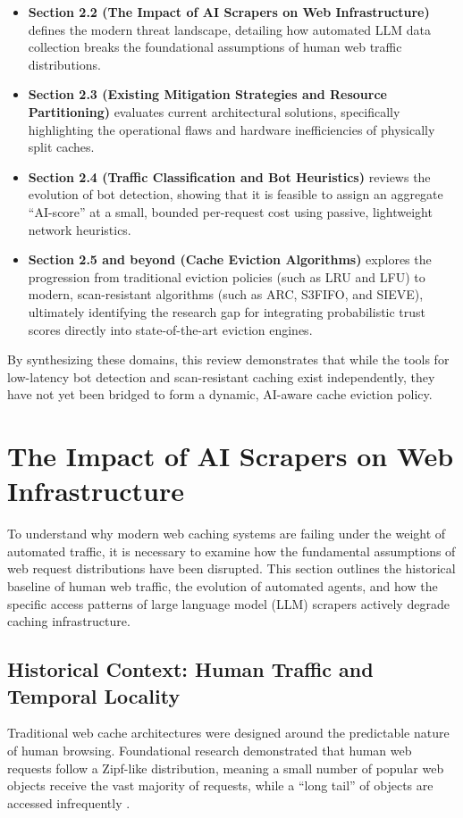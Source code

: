 \begin{itemize}
    \item \textbf{Section 2.2 (The Impact of AI Scrapers on Web Infrastructure)} defines the modern threat landscape, detailing how automated LLM data collection breaks the foundational assumptions of human web traffic distributions.
    \item \textbf{Section 2.3 (Existing Mitigation Strategies and Resource Partitioning)} evaluates current architectural solutions, specifically highlighting the operational flaws and hardware inefficiencies of physically split caches.
    \item \textbf{Section 2.4 (Traffic Classification and Bot Heuristics)} reviews the evolution of bot detection, showing that it is feasible to assign an aggregate ``AI-score'' at a small, bounded per-request cost using passive, lightweight network heuristics.
    \item \textbf{Section 2.5 and beyond (Cache Eviction Algorithms)} explores the progression from traditional eviction policies (such as LRU and LFU) to modern, scan-resistant algorithms (such as ARC, S3FIFO, and SIEVE), ultimately identifying the research gap for integrating probabilistic trust scores directly into state-of-the-art eviction engines.
\end{itemize}

By synthesizing these domains, this review demonstrates that while the tools for low-latency bot detection and scan-resistant caching exist independently, they have not yet been bridged to form a dynamic, AI-aware cache eviction policy.

\section{The Impact of AI Scrapers on Web Infrastructure}
To understand why modern web caching systems are failing under the weight of automated traffic, it is necessary to examine how the fundamental assumptions of web request distributions have been disrupted. This section outlines the historical baseline of human web traffic, the evolution of automated agents, and how the specific access patterns of large language model (LLM) scrapers actively degrade caching infrastructure.

\subsection{Historical Context: Human Traffic and Temporal Locality}
Traditional web cache architectures were designed around the predictable nature of human browsing. Foundational research demonstrated that human web requests follow a Zipf-like distribution, meaning a small number of popular web objects receive the vast majority of requests, while a ``long tail'' of objects are accessed infrequently \cite{breslau_web_1999}. 

